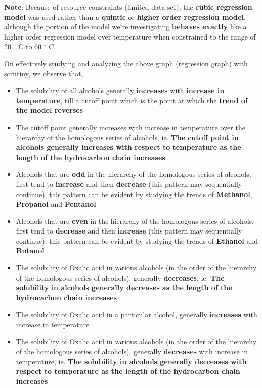 {\textbf{Note}: Because of resource constraints (limited data set), the \textbf{cubic regression model} was used rather than a \textbf{quintic} or \textbf{higher order regression model}, although the portion of the model we're investigating \textbf{behaves exactly} like a higher order regression model over temperature when constrained to the range of 20 $^\circ$ C to 60 $^\circ$ C.}

{On effectively studying and analyzing the above graph (regression graph) with scrutiny, we observe that,}

	\begin{itemize}
		\item {The solubility of all alcohols generally \textbf{increases} with \textbf{increase in temperature}, till a cutoff point which is the point at which the \textbf{trend of the model reverses}}
		\item {The cutoff point generally increases with increase in temperature over the hierarchy of the homologous series of alcohols, ie. \textbf{The cutoff point in alcohols generally increases with respect to temperature as the length of the hydrocarbon chain increases}}
		\item {Alcohols that are \textbf{odd} in the hierarchy of the homologous series of alcohols, first tend to \textbf{increase} and then \textbf{decrease} (this pattern may sequentially continue), this pattern can be evident by studying the trends of \textbf{Methanol}, \textbf{Propanol} and \textbf{Pentanol}}
		\item {Alcohols that are \textbf{even} in the hierarchy of the homologous series of alcohols, first tend to \textbf{decrease} and then \textbf{increase} (this pattern may sequentially continue), this pattern can be evident by studying the trends of \textbf{Ethanol} and \textbf{Butanol}}
		\item {The solubility of Oxalic acid in various alcohols (in the order of the hierarchy of the homologous series of alcohols), generally \textbf{decreases}, ie. \textbf{The solubility in alcohols generally decreases as the length of the hydrocarbon chain increases}}
		\item {The solubility of Oxalic acid in a particular alcohol, generally \textbf{increases} with increase in temperature}
		\item {The solubility of Oxalic acid in various alcohols (in the order of the hierarchy of the homologous series of alcohols), generally \textbf{decreases} with increase in temperature, ie. \textbf{The solubility in alcohols generally decreases with respect to temperature as the length of the hydrocarbon chain increases}}
	\end{itemize}

